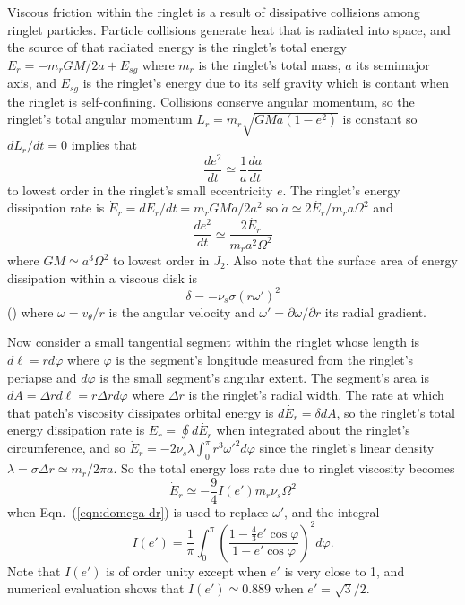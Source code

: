 \documentclass[preprint]{aastex62}
\begin{document}
Viscous friction within the ringlet is a result of dissipative collisions among ringlet particles.
Particle collisions generate heat that is radiated into space, and the source of that radiated energy
is the ringlet's total energy $E_r=-m_rGM/2a + E_{sg}$ where $m_r$ is the ringlet's total
mass, $a$ its semimajor axis, and $E_{sg}$ is the ringlet's energy due to its self gravity
which is contant when the ringlet is self-confining. 
Collisions conserve angular momentum, so the ringlet's total angular momentum
$L_r=m_r\sqrt{GMa(1-e^2)}$ is constant so $dL_r/dt=0$ implies that
\begin{equation}
    \label{eqn:e2-dot}
    \frac{de^2}{dt} \simeq \frac{1}{a}\frac{da}{dt}
\end{equation}
to lowest order in the ringlet's small eccentricity $e$.
The ringlet's energy dissipation rate is $\dot{E}_r = dE_r/dt=m_rGM\dot{a}/2a^2$ so
$\dot{a}\simeq2\dot{E_r}/m_ra\Omega^2$ and 
\begin{equation}
    \label{eqn:de2/dt}
    \frac{de^2}{dt} \simeq \frac{2\dot{E_r}}{m_r a^2\Omega^2}
\end{equation}
where $GM\simeq a^3\Omega^2$ to lowest order in $J_2$. Also note that
the surface area of energy dissipation within a viscous disk is
\begin{equation}
    \delta = -\nu_s\sigma(r\omega')^2
\end{equation}
(\citealt{P81}) where $\omega=v_\theta/r$ is the angular velocity and 
$\omega'=\partial\omega/\partial r$ its radial gradient.

Now consider a small tangential segment within the ringlet whose length is $d\ell=rd\varphi$ where 
$\varphi$ is the segment's longitude measured from the ringlet's periapse and
$d\varphi$ is the small segment's angular extent. The segment's area is 
$dA=\Delta rd\ell=r\Delta r d\varphi$
where $\Delta r$ is the ringlet's radial width.
The rate at which that patch's viscosity dissipates orbital energy is $d\dot{E_r}=\delta dA$, so
the ringlet's total energy dissipation rate is 
$\dot{E}_r = \oint d\dot{E_r}$ when integrated about the ringlet's circumference, and so
$\dot{E}_r = -2\nu_s\lambda\int_0^\pi r^3\omega'^2d\varphi$
since the ringlet's linear density $\lambda=\sigma\Delta r\simeq m_r/2\pi a$. So the
total energy loss rate due to ringlet viscosity becomes
\begin{equation}
    \label{eqn:dE_r/dt}
    \dot{E}_r \simeq -\frac{9}{4}I(e')m_r\nu_s\Omega^2
\end{equation}
when Eqn.\ (\ref{eqn:domega-dr}) is used to replace $\omega'$, and the integral 
\begin{equation}
    I(e') =  \frac{1}{\pi}\int_0^\pi\left(\frac{1-\frac{4}{3}e'\cos\varphi}{1-e'\cos\varphi}\right)^2d\varphi .
\end{equation}
Note that  $I(e')$ is of order
unity except when $e'$ is very close to 1, and numerical evaluation shows that $I(e')\simeq0.889$
when $e'=\sqrt{3}/2$.
\end{document}
